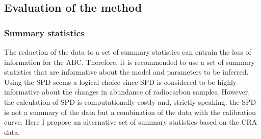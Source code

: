 \documentclass[a4paper]{article}
\begin{document}








\subsection*{Evaluation of the method}

\subsubsection*{Summary statistics}

The reduction of the data to a set of summary statistics can entrain the loss of information for the ABC. Therefore, it is recommended to use a set of summary statistics that are informative about the model and parameters to be inferred. Using the SPD \parencite[as in][]{Porcic2020,DiNapoli2021} seems a logical choice since SPD is considered to be highly informative about the changes in abundance of radiocarbon samples. However, the calculation of SPD is computationally costly and, strictly speaking, the SPD is not a summary of the data but a combination of the data with the calibration curve. Here I propose an alternative set of summary statistics based on the CRA data.
\\
\end{document}
